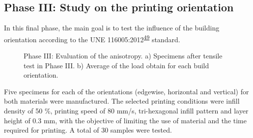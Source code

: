 \documentclass[
  12pt]{article}
\begin{document}
\newpage

\hypertarget{phase-iii-study-on-the-printing-orientation}{%
\subsection{Phase III: Study on the printing orientation}\label{phase-iii-study-on-the-printing-orientation}}

In this final phase, the main goal is to test the influence of the building orientation according to the UNE 116005:2012\textsuperscript{\protect\hyperlink{ref-Garcia-Dominguez2020}{49}} standard.

\begin{figure}[!h]

{\centering {}

}

\caption{Phase III: Evaluation of the anisotropy. a) Specimens after tensile test in  Phase III. b) Average of the load obtain for each build orientation.}\label{fig:phase3}
\end{figure}

Five specimens for each of the orientations (edgewise, horizontal and vertical) for both materials were manufactured.
The selected printing conditions were infill density of 50 \%, printing speed of 80 mm/s, tri-hexagonal infill pattern and layer height of 0.3 mm, with the objective of limiting the use of material and the time required for printing.
A total of 30 samples were tested.
\end{document}

